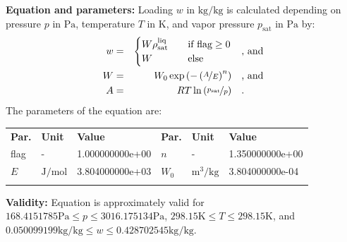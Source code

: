 \textbf{Equation and parameters:}
\newline
%
Loading $w$ in $\si{\kilogram\per\kilogram}$ is calculated depending on pressure $p$ in $\si{\pascal}$, temperature $T$ in $\si{\kelvin}$, and vapor pressure $p_\mathrm{sat}$ in $\si{\pascal}$ by:
%
\begin{equation*}
\begin{split}
w &=& \begin{cases} W \rho_\mathrm{sat}^{\mathrm{liq}} & \quad \text{if flag} \geq 0 \\ W & \quad \text{else} \end{cases} & \quad\text{, and} \\
W &=& W_0 \exp \left( - \left( \nicefrac{A}{E} \right) ^{n} \right) & \quad\text{, and} \\
A &=& R T \ln \left( \nicefrac{p_\mathrm{sat}}{p} \right) & \quad\text{.} \\
\end{split}
\end{equation*}
%
The parameters of the equation are:
%
\begin{longtable}[l]{lll|lll}
\toprule
\addlinespace
\textbf{Par.} & \textbf{Unit} & \textbf{Value} &	\textbf{Par.} & \textbf{Unit} & \textbf{Value} \\
\addlinespace
\midrule
\endhead

\bottomrule
\endfoot
\bottomrule
\endlastfoot
\addlinespace

flag & - & 1.000000000e+00 & $n$ & - & 1.350000000e+00 \\
$E$ & $\si{\joule\per\mole}$ & 3.804000000e+03 & $W_0$ & $\si{\cubic\meter\per\kilogram}$ & 3.804000000e-04 \\

\addlinespace\end{longtable}

\textbf{Validity:}
\newline
Equation is approximately valid for $168.4151785 \si{\pascal} \leq p \leq 3016.175134 \si{\pascal}$,  $298.15 \si{\kelvin} \leq T \leq 298.15 \si{\kelvin}$, and $0.050099199 \si{\kilogram\per\kilogram} \leq w \leq 0.428702545 \si{\kilogram\per\kilogram}$.
\newline

